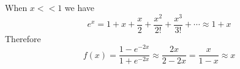 \usepackage{html}


When $x<<1$ we have
\[ e^x=1+x+\frac{x}{2}+\frac{x^2}{2!}+\frac{x^3}{3!}+\cdots \approx 1+x \]
Therefore
\[ f(x)=\frac{1-e^{-2x}}{1+e^{-2x}}\approx\frac{2x}{2-2x}=\frac{x}{1-x}\approx x  \]



